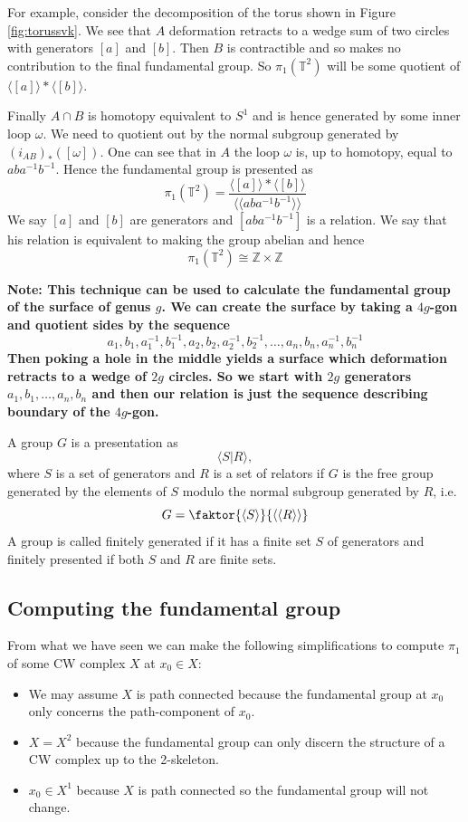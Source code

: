 \documentclass[11pt]{article}
\newcommand{\Z}{\mathbb{Z}}
\newenvironment{defin}
	{\begin{mdframed}[backgroundcolor=white, roundcorner=5pt, linewidth=1pt]
		\setlength{\parindent}{0pt}
		}
	{\end{mdframed}}
\newcommand{\mdf}[1]{{\color{red} #1}}
\newenvironment{note}
	{\begin{mdframed}[backgroundcolor=white, linecolor=red, roundcorner=5pt, linewidth=1pt]\bfseries{Note:}\normalfont}
	{\end{mdframed}}
\begin{document}
For example, consider the decomposition of the torus shown in Figure \ref{fig:torussvk}.
We see that $A$ deformation retracts to a wedge sum of two circles with generators $[a]$ and $[b]$.
Then $B$ is contractible and so makes no contribution to the final fundamental group.
So $\pi_1(\mathbb{T}^2)$ will be some quotient of $\langle\left[a\right]\rangle\ast\langle\left[b\right]\rangle$.

Finally $A\cap B$ is homotopy equivalent to $S^1$ and is hence generated by some inner loop $\omega$.
We need to quotient out by the normal subgroup generated by $\left(i_{AB}\right)_\ast([\omega])$.
One can see that in $A$ the loop $\omega$ is, up to homotopy, equal to $aba^{-1}b^{-1}$.
Hence the fundamental group is presented as
\[
	\pi_1(\mathbb{T}^2)=\frac{\langle\left[a\right]\rangle\ast\langle\left[b\right]\rangle}{\langle\langle aba^{-1}b^{-1}\rangle\rangle}
\]
We say $\left[a\right]$ and $\left[b\right]$ are \mdf{generators} and $\left[aba^{-1}b^{-1}\right]$ is a \mdf{relation}.
We say that his relation is equivalent to making the group abelian and hence
\[
	\pi_1(\mathbb{T}^2)\cong\Z\times \Z
\]
\begin{note}
This technique can be used to calculate the fundamental group of the surface of genus $g$.
We can create the surface by taking a $4g$-gon and quotient sides by the sequence
\[
	a_1, b_1, a_1^{-1}, b_1^{-1}, a_2, b_2, a_2^{-1}, b_2^{-1}, \dots, a_n, b_n, a_n^{-1}, b_n^{-1}
\]
Then poking a hole in the middle yields a surface which deformation retracts to a wedge of $2g$ circles.
So we start with $2g$ generators $a_1, b_1, \dots, a_n, b_n$ and then our relation is just the sequence describing boundary of the $4g$-gon.
\end{note}

\begin{defin}
	A group $G$ is a \mdf{presentation} as
	\[
		\langle S | R\rangle,
	\]
	where $S$ is a set of \mdf{generators} and $R$ is a set of \mdf{relators} if $G$ is the free group generated by the elements of $S$ modulo the normal subgroup generated by $R$, i.e.
	\[
		G=\faktor{\langle S\rangle}{\langle\langle R\rangle\rangle}
	\]
	A group is called \mdf{finitely generated} if it has a finite set $S$ of generators and \mdf{finitely presented} if both $S$ and $R$ are finite sets.
\end{defin}

\subsection{Computing the fundamental group}
From what we have seen we can make the following simplifications to compute $\pi_1$ of some CW complex $X$ at $x_0\in X$:
\begin{itemize}
	\item We may assume $X$ is path connected because the fundamental group at $x_0$ only concerns the path-component of $x_0$.
	\item $X=X^2$ because the fundamental group can only discern the structure of a CW complex up to the 2-skeleton.
	\item $x_0\in X^1$ because $X$ is path connected so the fundamental group will not change.
\end{itemize}
\end{document}
